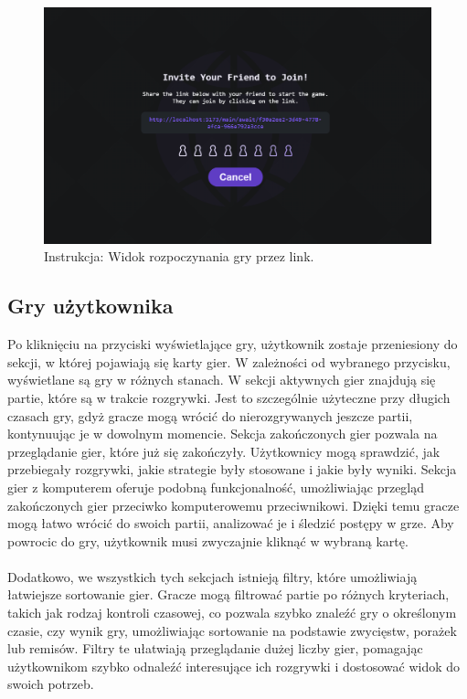 \documentclass[twoside]{projektInzynierskiMS1}
\begin{document}
\vspace{0.5cm}
\begin{figure}[h!]
    \centering
    \includegraphics[width=1\textwidth]{images/ins_min_link.png}
    \caption{Instrukcja: Widok rozpoczynania gry przez link.}
\end{figure}

\newpage

\subsection{Gry użytkownika}

\noindent
Po kliknięciu na przyciski wyświetlające gry, użytkownik zostaje przeniesiony do sekcji, w której pojawiają się karty gier. W zależności od wybranego przycisku, wyświetlane są gry w różnych stanach. W sekcji aktywnych gier znajdują się partie, które są w trakcie rozgrywki. Jest to szczególnie użyteczne przy długich czasach gry, gdyż gracze mogą wrócić do nierozgrywanych jeszcze partii, kontynuując je w dowolnym momencie. Sekcja zakończonych gier pozwala na przeglądanie gier, które już się zakończyły. Użytkownicy mogą sprawdzić, jak przebiegały rozgrywki, jakie strategie były stosowane i jakie były wyniki. Sekcja gier z komputerem oferuje podobną funkcjonalność, umożliwiając przegląd zakończonych gier przeciwko komputerowemu przeciwnikowi. Dzięki temu gracze mogą łatwo wrócić do swoich partii, analizować je i śledzić postępy w grze. Aby powrocic do gry, użytkownik musi zwyczajnie kliknąć w wybraną kartę.
\\\\
Dodatkowo, we wszystkich tych sekcjach istnieją filtry, które umożliwiają łatwiejsze sortowanie gier. Gracze mogą filtrować partie po różnych kryteriach, takich jak rodzaj kontroli czasowej, co pozwala szybko znaleźć gry o określonym czasie, czy wynik gry, umożliwiając sortowanie na podstawie zwycięstw, porażek lub remisów. Filtry te ułatwiają przeglądanie dużej liczby gier, pomagając użytkownikom szybko odnaleźć interesujące ich rozgrywki i dostosować widok do swoich potrzeb.
\end{document}
